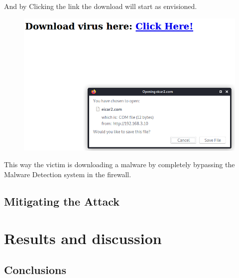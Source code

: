 \documentclass[status=normal,cover=tesi,language=en]{gmeepd}
\begin{document}
And by Clicking the link the download will start as envisioned.

\begin{figure}[h!]
 \centering
 \includegraphics[width=13cm]{img/after_proxy.png}
\end{figure}

This way the victim is downloading a malware by completely bypassing the Malware Detection system in the firewall.


\pagebreak

\section{Mitigating the Attack}


\chapter{Results and discussion}
\section{Conclusions}



\ListOfFigures  %


\PrintIndex %
\end{document}
